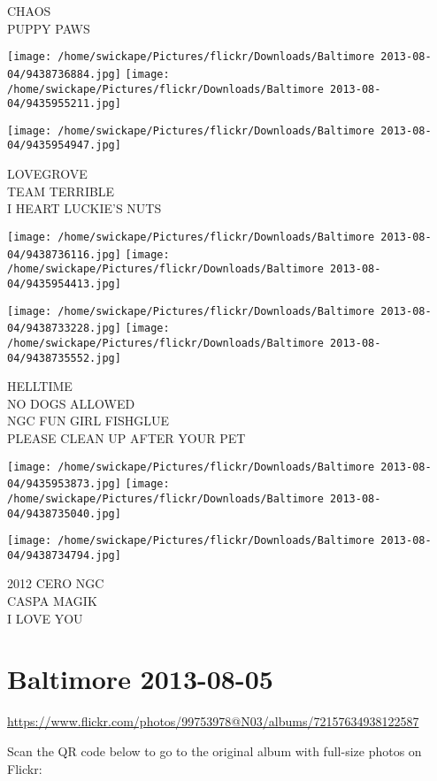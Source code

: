 \documentclass[10pt,letterpaper]{article}
\begin{document}
CHAOS\\
PUPPY PAWS
\pagebreak

\texttt{[image: /home/swickape/Pictures/flickr/Downloads/Baltimore 2013-08-04/9438736884.jpg]}
\texttt{[image: /home/swickape/Pictures/flickr/Downloads/Baltimore 2013-08-04/9435955211.jpg]}

\vspace{0.25in}
\texttt{[image: /home/swickape/Pictures/flickr/Downloads/Baltimore 2013-08-04/9435954947.jpg]}

LOVEGROVE\\
TEAM TERRIBLE\\
I HEART LUCKIE'S NUTS
\pagebreak

\texttt{[image: /home/swickape/Pictures/flickr/Downloads/Baltimore 2013-08-04/9438736116.jpg]}
\texttt{[image: /home/swickape/Pictures/flickr/Downloads/Baltimore 2013-08-04/9435954413.jpg]}

\texttt{[image: /home/swickape/Pictures/flickr/Downloads/Baltimore 2013-08-04/9438733228.jpg]}
\texttt{[image: /home/swickape/Pictures/flickr/Downloads/Baltimore 2013-08-04/9438735552.jpg]}

HELLTIME\\
NO DOGS ALLOWED\\
NGC FUN GIRL FISHGLUE\\
PLEASE CLEAN UP AFTER YOUR PET
\pagebreak

\texttt{[image: /home/swickape/Pictures/flickr/Downloads/Baltimore 2013-08-04/9435953873.jpg]}
\texttt{[image: /home/swickape/Pictures/flickr/Downloads/Baltimore 2013-08-04/9438735040.jpg]}

\vspace{0.25in}
\texttt{[image: /home/swickape/Pictures/flickr/Downloads/Baltimore 2013-08-04/9438734794.jpg]}

2012 CERO NGC\\
CASPA MAGIK\\
I LOVE YOU
\pagebreak

\section*{Baltimore 2013-08-05}

\url{https://www.flickr.com/photos/99753978@N03/albums/72157634938122587}

Scan the QR code below to go to the original album with full-size photos on Flickr:
\end{document}
